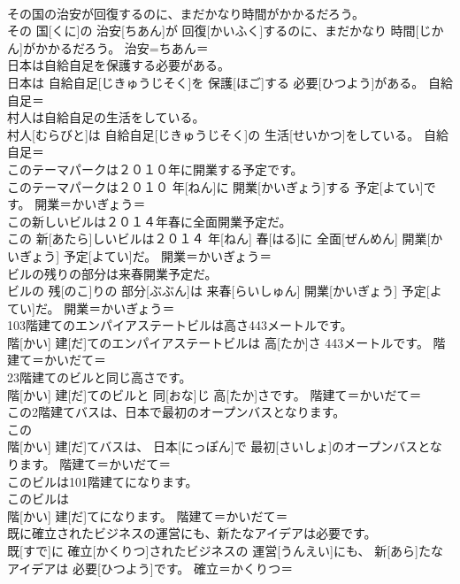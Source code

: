 \documentclass[8pt]{extreport}
\begin{document}
\begin{CJK}{UTF8}{min}
\\	その国の治安が回復するのに、まだかなり時間がかかるだろう。	
\\	その 国[くに]の 治安[ちあん]が 回復[かいふく]するのに、まだかなり 時間[じかん]がかかるだろう。	治安=ちあん＝ 
\\	日本は自給自足を保護する必要がある。	
\\	日本は 自給自足[じきゅうじそく]を 保護[ほご]する 必要[ひつよう]がある。	自給自足＝ 
\\	村人は自給自足の生活をしている。	
\\	村人[むらびと]は 自給自足[じきゅうじそく]の 生活[せいかつ]をしている。	自給自足＝ 
\\	このテーマパークは２０１０年に開業する予定です。	
\\	このテーマパークは２０１０ 年[ねん]に 開業[かいぎょう]する 予定[よてい]です。	開業＝かいぎょう＝ 
\\	この新しいビルは２０１４年春に全面開業予定だ。	
\\	この 新[あたら]しいビルは２０１４ 年[ねん] 春[はる]に 全面[ぜんめん] 開業[かいぎょう] 予定[よてい]だ。	開業＝かいぎょう＝ 
\\	ビルの残りの部分は来春開業予定だ。	
\\	ビルの 残[のこ]りの 部分[ぶぶん]は 来春[らいしゅん] 開業[かいぎょう] 予定[よてい]だ。	開業＝かいぎょう＝ 
\\	103階建てのエンパイアステートビルは高さ443メートルです。	
\\	階[かい] 建[だ]てのエンパイアステートビルは 高[たか]さ 443メートルです。	階建て＝かいだて＝ 
\\	23階建てのビルと同じ高さです。	
\\	階[かい] 建[だ]てのビルと 同[おな]じ 高[たか]さです。	階建て＝かいだて＝ 
\\	この2階建てバスは、日本で最初のオープンバスとなります。	
\\	この 
\\	階[かい] 建[だ]てバスは、 日本[にっぽん]で 最初[さいしょ]のオープンバスとなります。	階建て＝かいだて＝ 
\\	このビルは101階建てになります。	
\\	このビルは 
\\	階[かい] 建[だ]てになります。	階建て＝かいだて＝ 
\\	既に確立されたビジネスの運営にも、新たなアイデアは必要です。	
\\	既[すで]に 確立[かくりつ]されたビジネスの 運営[うんえい]にも、 新[あら]たなアイデアは 必要[ひつよう]です。	確立＝かくりつ＝ 

\end{CJK}
\end{document}
